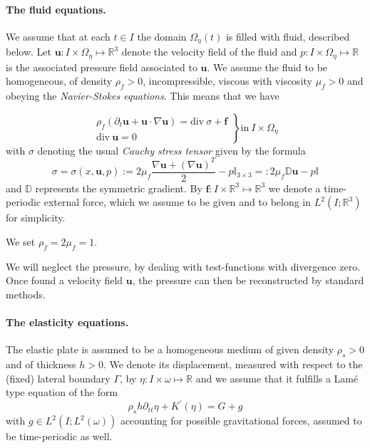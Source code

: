 \documentclass[10pt,a4paper]{article}
\numberwithin{equation}{section}
\begin{document}
\paragraph{The fluid equations.}
We assume that at each $t\in I$ the domain $\Omega_{\eta}\left(t\right)$ is filled with  fluid, described below.
Let $\mathbf{u}:I\times\Omega_{\eta}\mapsto\mathbb{R}^{3}$ denote the velocity field of the fluid and $p:I\times \Omega_{\eta}\mapsto \mathbb{R}$ is the associated pressure field associated to $\mathbf{u}$. We assume the fluid to be homogeneous, of density $\rho_{f}>0$, incompressible, viscous with viscosity $\mu_{f}>0$ and obeying the \emph{Navier-Stokes equations}. This means that we have 

\begin{equation}\label{eqn:fluid}
 \left.\begin{array}{c}
\rho_{f}\left(\partial_{t}\mathbf{u}+\mathbf{u}\cdot\nabla\mathbf{u}\right)=\text{div}\ \sigma+\mathbf{f}\\
\text{div}\ \mathbf{u}=0
\end{array}\right\} \text{in}\ I\times\Omega_{\eta}
\end{equation}
with $\sigma$ denoting the usual \emph{Cauchy stress tensor} given by the formula 
\begin{equation}
\sigma=\sigma(x,\mathbf{u},p):=2\mu_{f}\frac{\nabla\mathbf{u}+\left(\nabla\mathbf{u}\right)^{T}}{2}-p\mathbb{I}_{3\times3}=:2\mu_{f}\mathbb{D}\mathbf{u}-p\mathbb{I}
\end{equation}
and $\mathbb{D}$ represents the symmetric gradient. 
By $\mathbf{f}:I\times\mathbb{R}^{3}\mapsto\mathbb{R}^{3}$ we denote a time-periodic external force, which we assume to be given and to belong in $L^{2}\left(I;\mathbb{R}^{3}\right)$ for simplicity. 

We set $\rho_{f}=2\mu_{f}=1$.

We will neglect the pressure, by dealing with test-functions with divergence zero. 
Once found a velocity field $\mathbf{u}$, the pressure can then be reconstructed by standard methods.


\paragraph{The elasticity equations.}


The elastic plate is assumed to be a homogeneous medium of given density $\rho_{s}>0$ and of thickness $h>0$. 
We denote its displacement, measured with respect to the (fixed) lateral boundary $\Gamma$, by $\eta:I\times\omega \mapsto \mathbb{R}$ and we assume that it fulfills a Lam\'{e} type equation of the form 
\begin{equation}\label{eqn:lame}
\rho_{s}h\partial_{tt}\eta+K^{\prime}\left(\eta\right)=G+g
\end{equation}
with $g\in L^{2}\left(I;L^{2}\left(\omega\right)\right)$ accounting for possible gravitational forces, assumed to be time-periodic as well. 
\end{document}
